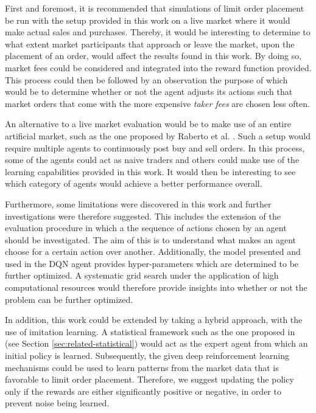 First and foremost, it is recommended that simulations of limit order placement be run with the setup provided in this work on a live market where it would make actual sales and purchases.
Thereby, it would be interesting to determine to what extent market participants that approach or leave the market, upon the placement of an order, would affect the results found in this work.
By doing so, market fees could be considered and integrated into the reward function provided. This process could then be followed by an observation the purpose of which would be to determine whether or not the agent adjusts its actions such that market orders that come with the more expensive \textit{taker fees} are chosen less often.

An alternative to a live market evaluation would be to make use of an entire artificial market, such as the one proposed by Raberto et al. \cite{raberto2005price}. 
Such a setup would require multiple agents to continuously post buy and sell orders.
In this process, some of the agents could act as naive traders and others could make use of the learning capabilities provided in this work.
It would then be interesting to see which category of agents would achieve a better performance overall.

Furthermore, some limitations were discovered in this work and further investigations were therefore suggested.
This includes the extension of the evaluation procedure in which a the sequence of actions chosen by an agent should be investigated.
The aim of this is to understand what makes an agent choose for a certain action over another.
Additionally, the model presented and used in the DQN agent provides hyper-parameters which are determined to be further optimized.
A systematic grid search under the application of high computational resources would therefore provide insights into whether or not the problem can be further optimized.

In addition, this work could be extended by taking a hybrid approach, with the use of imitation learning.
A statistical framework such as the one proposed in \cite{yingsaeree2012algorithmic} (see Section \ref{sec:related-statistical}) would act as the expert agent from which an initial policy is learned.
Subsequently, the given deep reinforcement learning mechanisms could be used to learn patterns from the market data that is favorable to limit order placement.
Therefore, we suggest updating the policy only if the rewards are either significantly positive or negative, in order to prevent  noise being learned.

